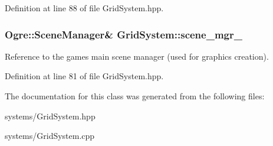 Definition at line 88 of file Grid\+System.\+hpp.

\subsubsection[{\texorpdfstring{scene\+\_\+mgr\+\_\+}{scene_mgr_}}]{\setlength{\rightskip}{0pt plus 5cm}Ogre\+::\+Scene\+Manager\& Grid\+System\+::scene\+\_\+mgr\+\_\+\hspace{0.3cm}{\ttfamily [private]}}\hypertarget{class_grid_system_a01626368dc7fde9dfc4b7961aa93cfe9}{}\label{class_grid_system_a01626368dc7fde9dfc4b7961aa93cfe9}


Reference to the game\textquotesingle{}s main scene manager (used for graphics creation). 



Definition at line 81 of file Grid\+System.\+hpp.



The documentation for this class was generated from the following files\+:\begin{DoxyCompactItemize}
\item 
systems/Grid\+System.\+hpp\item 
systems/Grid\+System.\+cpp\end{DoxyCompactItemize}
